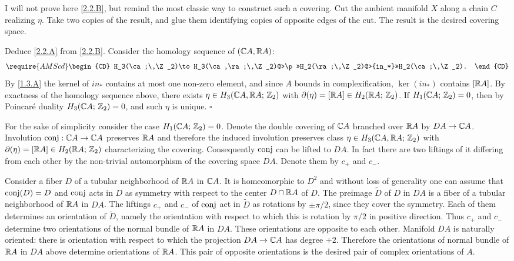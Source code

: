 \documentclass{article}
\numberwithin{equation}{section}
\begin{document}
I will not prove here \ref{2.2.B}, but remind the most classic way to
construct such a covering. Cut the ambient manifold $X$ along a chain
$C$ realizing $\eta$. Take two copies of the result, and glue them
identifying copies of opposite edges of the cut. The result is the
desired covering space.

Deduce \ref{2.2.A} from \ref{2.2.B}. 
Consider the homology sequence of $(\mathbb C A,\mathbb R A)$:
$$\require{AMScd}
\begin{CD}
H_3(\ca;\,\Z_2)\to
H_3(\ca,\ra;\,\Z_2)@>\p>>H_2(\ra;\,\Z_2)@>{in_*}>>H_2(\ca;\,\Z_2).
\end{CD}
$$
By \ref{1.3.A} the kernel of $in_*$ contains at most one non-zero element,
and since $A$ bounds in complexification, $\ker(in_*)$ contains
$[\mathbb R A]$. By exactness of the homology sequence above, there exists
$\eta\in H_3(\mathbb C A,\mathbb R A;\,\mathbb Z_2)$ with $\partial(\eta)=[\mathbb R A]\in
H_2(\mathbb R A;\,\mathbb Z_2)$. If $H_1(\mathbb C A;\,\mathbb Z_2)=0$, then by Poincar\'{e} duality
$H_3(\mathbb C A;\,\mathbb Z_2)=0$, and such $\eta$ is unique. $\square$

For the sake of simplicity consider the case $H_1(\mathbb C A;\,\mathbb Z_2)=0$.
Denote the double covering of $\mathbb C A$ branched over $\mathbb R A$ by
$DA\to\mathbb C A$. Involution $\operatorname{conj}:\mathbb C A\to\mathbb C A$ preserves $\mathbb R A$ and
therefore the induced involution preserves class $\eta\in
H_3(\mathbb C A,\mathbb R A;\,\mathbb Z_2)$ with $\partial(\eta)=[\mathbb R A]\in H_2(\mathbb R A;\,\mathbb Z_2)$
characterizing the covering. Consequently $\operatorname{conj}$ can be lifted to
$DA$. In fact there are two liftings of it differing from each other
by the non-trivial automorphism of the covering space $DA$. Denote
them by $c_+$ and $c_-$.

Consider a fiber $D$ of a tubular neighborhood of $\mathbb R A$ in
$\mathbb C A$. It is homeomorphic to $D^2$ and without loss of generality
one can assume that $\operatorname{conj} (D)=D$ and $\operatorname{conj}$ acts in $D$ as
symmetry with respect to the center $D\cap \mathbb R A$ of $D$.  The preimage
$\tilde D$ of $D$ in $DA$ is a fiber of a tubular neighborhood of
$\mathbb R A$ in $DA$.  The liftings $c_+$ and $c_-$ of $\operatorname{conj}$ act in
$\tilde D$ as rotations by $\pm \pi/2$, since they cover the
symmetry. Each of them determines an orientation of $\tilde D$,
namely the orientation with respect to which this is rotation by
$\pi/2$ in positive direction. Thus $c_+$ and $c_-$ determine two
orientations of the normal bundle of $\mathbb R A$ in $DA$. These
orientations are opposite to each other. Manifold $DA$ is
naturally oriented: there is orientation with respect to which the
projection $DA\to\mathbb C A$ has degree $+2$. Therefore the orientations of
normal bundle of $\mathbb R A$ in $DA$ above determine orientations of
$\mathbb R A$. This pair of opposite orientations is the desired pair of
complex orientations of $A$.
\end{document}
